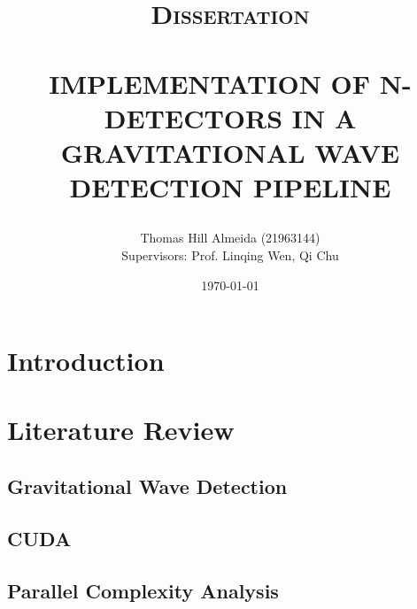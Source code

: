 \documentclass{article}
\title{\normalsize \textsc{Dissertation}
        \\ [1.5cm]
        \HRule{0.5pt} \\
        \LARGE \textbf{\uppercase{Implementation of N-detectors in a gravitational wave detection pipeline}}
        \HRule{2pt} \\ [0.5cm]
        \normalsize \date{\today} \vspace*{3\baselineskip}}
\author{Thomas Hill Almeida (21963144)\\
\small{Supervisors: Prof. Linqing Wen, Qi Chu}}
\date{}
\begin{document}
\maketitle{}
\tableofcontents{}
\newpage{}

\begin{minipage}[t]{0.6\textwidth}
    \centering
    \section*{} \label{sec:abstract}
\end{minipage}
\section{Introduction} \label{sec:introduction}
\section{Literature Review} \label{sec:lit_review}
\subsection{Gravitational Wave Detection} \label{sec:lit_review:grav_wave}
\subsection{CUDA} \label{sec:lit_review:cuda}
\subsection{Parallel Complexity Analysis} \label{sec:lit_review:par_comp_analysis}
\end{document}
